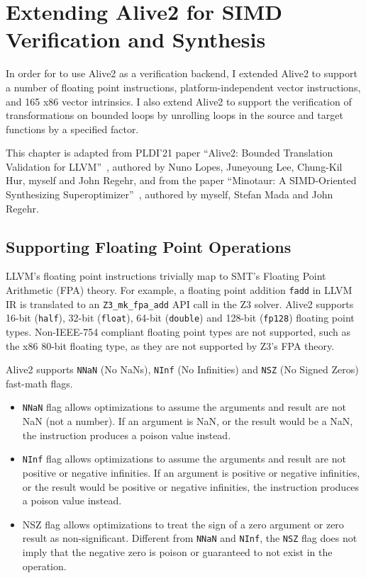 \chapter{Extending Alive2 for SIMD Verification and Synthesis}
\label{chap:extending-alive2}

In order for \minotaur{} to use Alive2 as a verification backend, I extended
Alive2 to support a number of floating point instructions,
platform-independent vector instructions, and 165 x86 vector intrinsics.
%
I also extend Alive2 to support the verification of transformations on
bounded loops by unrolling loops in the source and target functions by
a specified factor.

This chapter is adapted from PLDI'21 paper ``Alive2: Bounded
Translation Validation for LLVM''~\cite{alive2}, authored by Nuno
Lopes, Juneyoung Lee, Chung-Kil Hur, myself and John Regehr, and from
the paper ``Minotaur: A SIMD-Oriented Synthesizing
Superoptimizer''~\cite{minotaur}, authored by myself, Stefan Mada and
John Regehr.


\section{Supporting Floating Point Operations}

LLVM's floating point instructions trivially map to SMT's Floating
Point Arithmetic (FPA) theory.
%
For example, a floating point addition \texttt{fadd} in LLVM IR is
translated to an \texttt{Z3\_mk\_fpa\_add} API call in the Z3 solver.
%
Alive2 supports 16-bit (\texttt{half}), 32-bit (\texttt{float}), 64-bit
(\texttt{double}) and 128-bit (\texttt{fp128}) floating point types.
%
Non-IEEE-754 compliant floating point types are not supported, such as
the x86 80-bit floating type, as they are not supported by Z3's FPA
theory.

Alive2 supports \texttt{NNaN} (No NaNs), \texttt{NInf} (No Infinities) and
\texttt{NSZ} (No Signed Zeros) fast-math flags.

\begin{itemize}

\item \texttt{NNaN} flag allows optimizations to assume the arguments
and result are not NaN (not a number). If an argument is
NaN, or the result would be a NaN, the instruction produces a
poison value instead.

\item \texttt{NInf} flag allows optimizations to assume the arguments
and result are not positive or negative infinities. If an argument is
positive or negative infinities, or the result would be positive or
negative infinities, the instruction produces a poison value instead.

\item NSZ flag allows optimizations to treat the sign of a zero
argument or zero result as non-significant. Different from
\texttt{NNaN} and \texttt{NInf}, the \texttt{NSZ} flag does not imply
that the negative zero is poison or guaranteed to not exist in the
operation.

\end{itemize}

